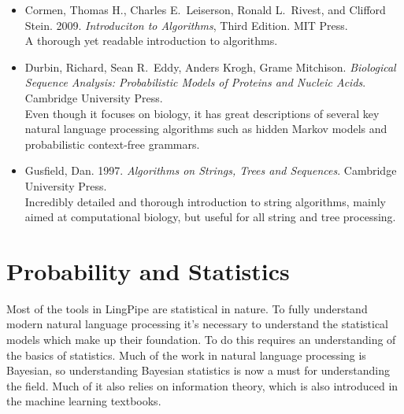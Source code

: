 \begin{itemize}
%
\item
Cormen, Thomas H., Charles E.\ Leiserson, Ronald L.\ Rivest, and
Clifford Stein. 
2009.
{\it Introduciton to Algorithms}, Third Edition.
MIT Press.
\\
{\footnotesize A thorough yet readable introduction to algorithms.}
%
\item
Durbin, Richard, Sean R.\ Eddy, Anders Krogh, Grame Mitchison.
{\it Biological Sequence Analysis: Probabilistic Models of Proteins
and Nucleic Acids}.
Cambridge University Press.
\\
{\footnotesize Even though it focuses on biology, it has great
descriptions of several key natural language processing algorithms
such as hidden Markov models and probabilistic context-free grammars.}
%
\item
Gusfield, Dan.
1997.
{\it Algorithms on Strings, Trees and Sequences}.
Cambridge University Press.
\\
{\footnotesize Incredibly detailed and thorough introduction to
string algorithms, mainly aimed at computational biology, but
useful for all string and tree processing.}
%
\end{itemize}






\section{Probability and Statistics}

\noindent
Most of the tools in LingPipe are statistical in nature.  To fully
understand modern natural language processing it's necessary to
understand the statistical models which make up their foundation.
To do this requires an understanding of the basics of statistics.
Much of the work in natural language processing is Bayesian, so
understanding Bayesian statistics is now a must for understanding
the field.  Much of it also relies on information theory, which is
also introduced in the machine learning textbooks.

